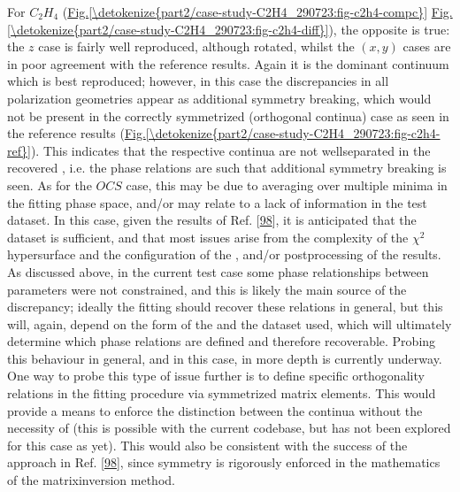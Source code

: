 \documentclass[letterpaper,table,10pt,english]{jupyterBook}
\begin{document}
\sphinxAtStartPar
For \(C_2H_4\) (\hyperref[\detokenize{part2/case-study-C2H4_290723:fig-c2h4-compc}]{Fig.\@ \ref{\detokenize{part2/case-study-C2H4_290723:fig-c2h4-compc}}} \sphinxhyphen{} \hyperref[\detokenize{part2/case-study-C2H4_290723:fig-c2h4-diff}]{Fig.\@ \ref{\detokenize{part2/case-study-C2H4_290723:fig-c2h4-diff}}}), the opposite is true: the \(z\) case is fairly well reproduced, although rotated, whilst the \((x,y)\) cases are in poor agreement with the reference results. Again it is the dominant continuum which is best reproduced; however, in this case the discrepancies in all polarization geometries appear as additional symmetry breaking, which would not be present in the correctly symmetrized (orthogonal continua) case \sphinxhyphen{} as seen in the reference results (\hyperref[\detokenize{part2/case-study-C2H4_290723:fig-c2h4-ref}]{Fig.\@ \ref{\detokenize{part2/case-study-C2H4_290723:fig-c2h4-ref}}}). This indicates that the respective continua are not well\sphinxhyphen{}separated in the recovered {\hyperref[\detokenize{backmatter/glossary:term-radial-matrix-elements}]{}}, i.e. the phase relations are such that additional symmetry breaking is seen. As for the \(OCS\) case, this may be due to averaging over multiple minima in the fitting phase space, and/or may relate to a lack of information in the test dataset. In this case, given the results of Ref. {[}\hyperlink{cite.backmatter/bibliography:id636}{98}{]}, it is anticipated that the dataset is sufficient, and that most issues arise from the complexity of the \(\chi^2\) hypersurface and the configuration of the {\hyperref[\detokenize{backmatter/glossary:term-bootstrap-retrieval-protocol}]{}}, and/or post\sphinxhyphen{}processing of the results. As discussed above, in the current test case some phase relationships between parameters were not constrained, and this is likely the main source of the discrepancy; ideally the fitting should recover these relations in general, but this will, again, depend on the form of the {\hyperref[\detokenize{backmatter/glossary:term-channel-functions}]{}} and the dataset used, which will ultimately determine which phase relations are defined and therefore recoverable. Probing this behaviour in general, and in this case, in more depth is currently underway. One way to probe this type of issue further is to define specific orthogonality relations in the fitting procedure via symmetrized matrix elements. This would provide a means to enforce the distinction between the continua without the necessity of  {\hyperref[\detokenize{backmatter/glossary:term-radial-matrix-elements}]{}} (this is possible with the current codebase, but has not been explored for this case as yet). This would also be consistent with the success of the approach in  Ref. {[}\hyperlink{cite.backmatter/bibliography:id636}{98}{]}, since symmetry is rigorously enforced in the mathematics of the matrix\sphinxhyphen{}inversion method.
\end{document}
